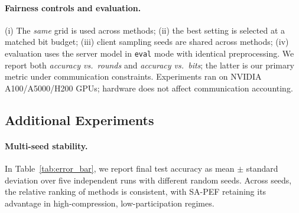 \documentclass{article} %
\begin{document}
\paragraph{Fairness controls and evaluation.}
(i) The \emph{same} grid is used across methods; (ii) the best setting is selected at a matched bit budget; (iii) client sampling seeds are shared across methods; (iv) evaluation uses the server model in \texttt{eval} mode with identical preprocessing.
We report both \emph{accuracy vs.\ rounds} and \emph{accuracy vs.\ bits}; the latter is our primary metric under communication constraints. Experiments ran on NVIDIA A100/A5000/H200 GPUs; hardware does not affect communication accounting.


\subsection{Additional Experiments}
\paragraph{Multi-seed stability.} In Table~\ref{tab:error_bar}, we report final test accuracy as mean $\pm$ standard deviation over five independent runs with different random seeds. Across seeds, the relative ranking of methods is consistent, with SA-PEF retaining its advantage in high-compression, low-participation regimes.
\end{document}

